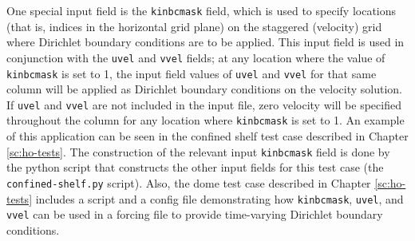 One special input field is the \texttt{kinbcmask} field, which is used to specify locations (that is,
indices in the horizontal grid plane) on the staggered (velocity) grid where Dirichlet boundary 
conditions are to be applied. This input field is used in conjunction with the \texttt{uvel} and 
\texttt{vvel} fields; at any location where the value of \texttt{kinbcmask} is set to 1, the input field
values of \texttt{uvel} and \texttt{vvel} for that same column will be applied as Dirichlet boundary
conditions on the velocity solution. If \texttt{uvel} and \texttt{vvel} are not included in the input file, 
zero velocity will be specified throughout the column for any location where \texttt{kinbcmask} is 
set to 1. An example of this application can be seen in the confined shelf test case described 
in Chapter \ref{sc:ho-tests}. The construction of the relevant input \texttt{kinbcmask} field 
is done by the python script that constructs the other input fields for this test case 
(the \texttt{confined-shelf.py} script).  Also, the dome test case described in 
Chapter \ref{sc:ho-tests} includes a script and a config file demonstrating how 
\texttt{kinbcmask}, \texttt{uvel}, and \texttt{vvel} 
can be used in a forcing file to provide time-varying Dirichlet boundary conditions. 


